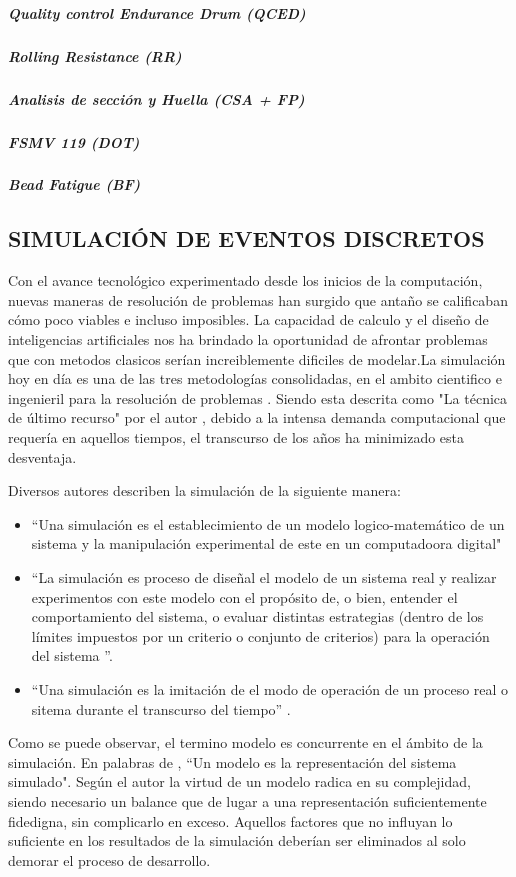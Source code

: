 \documentclass[12pt]{article}
\begin{document}
\subparagraph{Quality control Endurance Drum (QCED)}

\subparagraph{Rolling Resistance (RR)}

\subparagraph{Analisis de sección y Huella (CSA  + FP)}

\subparagraph{FSMV 119 (DOT)}

\subparagraph{Bead Fatigue (BF)}


\subsection{SIMULACIÓN DE EVENTOS DISCRETOS}
Con el avance tecnológico experimentado desde los inicios de la computación, nuevas maneras de resolución de problemas han surgido que antaño se calificaban cómo poco viables e incluso imposibles. La capacidad de calculo y el diseño de inteligencias artificiales nos ha brindado la oportunidad de afrontar problemas que con metodos clasicos serían increiblemente dificiles de modelar.La simulación hoy en día es una de las tres metodologías consolidadas, en el ambito cientifico e ingenieril para la resolución de problemas \citep{banks1998handbook}. Siendo esta descrita como "La técnica de último recurso" por el autor \citep{garzia1986discrete}, debido a la intensa demanda computacional que requería en aquellos tiempos, el transcurso de los años ha minimizado esta desventaja.

Diversos autores describen la simulación de la siguiente manera:
\begin{itemize}
\item ``Una simulación es el establecimiento de un modelo logico-matemático de un sistema y la manipulación experimental de este en un computadoora digital\citep{pritsker1974gasp}"

\item ``La simulación es proceso de diseñal el modelo de un sistema real y realizar experimentos con este modelo con el propósito de, o bien, entender el comportamiento del sistema, o evaluar distintas estrategias (dentro de los límites impuestos por un criterio o conjunto de criterios) para la operación del sistema \citep{shannon1976systems}''.

\item ``Una simulación es la imitación de el modo de operación de un proceso real o sitema durante el transcurso del tiempo'' \citep{banks1999introduction}.
\end{itemize}

Como se puede observar, el termino modelo es concurrente en el ámbito de la simulación. En palabras de \citep{banks1998handbook}, ``Un modelo es la representación del sistema simulado". Según el autor la virtud de un modelo radica en su complejidad, siendo necesario un balance que de lugar a una representación suficientemente fidedigna, sin complicarlo en exceso. Aquellos factores que no influyan lo suficiente en los resultados de la simulación deberían ser eliminados al solo demorar el proceso de desarrollo.
\end{document}
